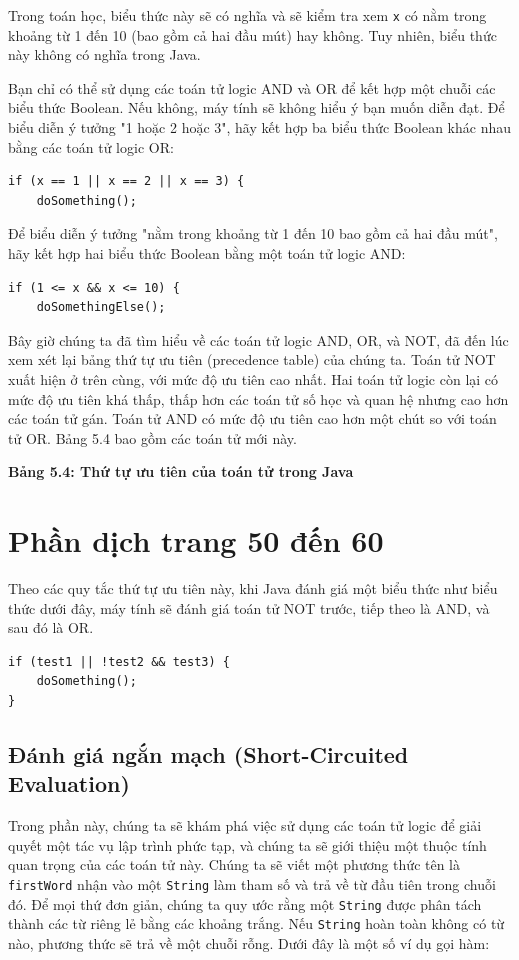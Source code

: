 Trong toán học, biểu thức này sẽ có nghĩa và sẽ kiểm tra xem \texttt{x} có nằm trong khoảng từ 1 đến 10 (bao gồm cả hai đầu mút) hay không. Tuy nhiên, biểu thức này không có nghĩa trong Java.

Bạn chỉ có thể sử dụng các toán tử logic AND và OR để kết hợp một chuỗi các biểu thức Boolean. Nếu không, máy tính sẽ không hiểu ý bạn muốn diễn đạt. Để biểu diễn ý tưởng "1 hoặc 2 hoặc 3", hãy kết hợp ba biểu thức Boolean khác nhau bằng các toán tử logic OR:
\begin{verbatim}
if (x == 1 || x == 2 || x == 3) {
    doSomething();
\end{verbatim}


Để biểu diễn ý tưởng "nằm trong khoảng từ 1 đến 10 bao gồm cả hai đầu mút", hãy kết hợp hai biểu thức Boolean bằng một toán tử logic AND:
\begin{verbatim}
if (1 <= x && x <= 10) {
    doSomethingElse();
\end{verbatim}


Bây giờ chúng ta đã tìm hiểu về các toán tử logic AND, OR, và NOT, đã đến lúc xem xét lại bảng thứ tự ưu tiên (precedence table) của chúng ta. Toán tử NOT xuất hiện ở trên cùng, với mức độ ưu tiên cao nhất. Hai toán tử logic còn lại có mức độ ưu tiên khá thấp, thấp hơn các toán tử số học và quan hệ nhưng cao hơn các toán tử gán. Toán tử AND có mức độ ưu tiên cao hơn một chút so với toán tử OR. Bảng 5.4 bao gồm các toán tử mới này.

\noindent \textbf{Bảng 5.4: Thứ tự ưu tiên của toán tử trong Java}
\section{Phần dịch trang 50 đến 60}
Theo các quy tắc thứ tự ưu tiên này, khi Java đánh giá một biểu thức như biểu thức dưới đây, máy tính sẽ đánh giá toán tử NOT trước, tiếp theo là AND, và sau đó là OR.

\begin{verbatim}
if (test1 || !test2 && test3) {
    doSomething();
}
\end{verbatim}

\subsection*{Đánh giá ngắn mạch (Short-Circuited Evaluation)}

Trong phần này, chúng ta sẽ khám phá việc sử dụng các toán tử logic để giải quyết một tác vụ lập trình phức tạp, và chúng ta sẽ giới thiệu một thuộc tính quan trọng của các toán tử này. Chúng ta sẽ viết một phương thức tên là \texttt{firstWord} nhận vào một \texttt{String} làm tham số và trả về từ đầu tiên trong chuỗi đó. Để mọi thứ đơn giản, chúng ta quy ước rằng một \texttt{String} được phân tách thành các từ riêng lẻ bằng các khoảng trắng. Nếu \texttt{String} hoàn toàn không có từ nào, phương thức sẽ trả về một chuỗi rỗng. Dưới đây là một số ví dụ gọi hàm:

